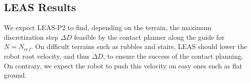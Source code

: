 \subsection{LEAS Results}
\label{subsub:mip:results}





We expect LEAS-P2 to find, depending on the terrain, the maximum discretization step $\Delta D$ feasible by the contact planner along the guide for $N=N_{ref}$.
On difficult terrains such as rubbles and stairs, LEAS should lower the robot root velocity, and thus $\Delta D$, to ensure the success of the contact planning. 
On contrary, we expect the robot to push this velocity on easy ones such as flat ground.



